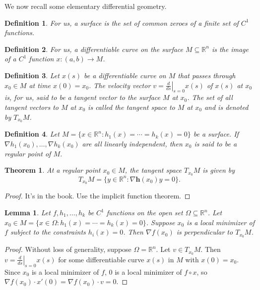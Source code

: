 \documentclass[11pt]{article}
\newcommand{\R}{\mathbb{R}}
\newtheorem{definition}{Definition}[subsection]
\newtheorem{theorem}{Theorem}[subsection]
\newtheorem{lemma}{Lemma}[subsection]
\begin{document}
We now recall some elementary differential geometry.
\begin{definition}
For us, a surface is the set of common zeroes of a finite set of $C^1$ functions. 
\end{definition}
\begin{definition}
For us, a differentiable curve on the surface $M \subseteq \R^n$ is the image of a $C^1$ function $x : (a, b) \to M$.
\end{definition}
\begin{definition}
Let $x(s)$ be a differentiable curve on $M$ that passes through $x_0 \in M$ at time $x(0) = x_0$. The velocity vector $v = \left. \frac{d}{ds} \right|_{s=0} x(s)$ of $x(s)$ at $x_0$ is, for us, said to be a tangent vector to the surface $M$ at $x_0$. The set of all tangent vectors to $M$ at $x_0$ is called the tangent space to $M$ at $x_0$ and is denoted by $T_{x_0}M$.
\end{definition}
\begin{definition}
Let $M = \{x \in \R^n : h_1(x) = \cdots = h_k(x) = 0\}$ be a surface. If $\nabla h_1(x_0), \dots, \nabla h_k(x_0)$ are all linearly independent, then $x_0$ is said to be a regular point of $M$.
\end{definition}
\begin{theorem}
At a regular point $x_0 \in M$, the tangent space $T_{x_0} M$ is given by
\[
T_{x_0} M = \{ y \in \R^n : \nabla \mathbf{h}(x_0)y = 0 \}.
\]
\end{theorem}
\begin{proof}
It's in the book. Use the implicit function theorem.
\end{proof}
\begin{lemma}
Let $f, h_1, \dots, h_k$ be $C^1$ functions on the open set $\Omega \subseteq \R^n$. Let $x_0 \in M = \{ x \in \Omega : h_1(x) = \cdots = h_k(x) = 0 \}$. Suppose $x_0$ is a local minimizer of $f$ subject to the constraints $h_i(x) = 0$. Then $\nabla f(x_0)$ is perpendicular to $T_{x_0}M$.
\end{lemma}
\begin{proof}
Without loss of generality, suppose $\Omega = \R^n$. Let $v \in T_{x_0}M$. Then $v = \left. \frac{d}{ds} \right|_{s=0}x(s)$ for some differentiable curve $x(s)$ in $M$ with $x(0) = x_0$. Since $x_0$ is a local minimizer of $f$, $0$ is a local minimizer of $f \circ x$, so $\nabla f(x_0) \cdot x'(0) = \nabla f(x_0) \cdot v = 0$.
\end{proof}

\newpage
\end{document}
